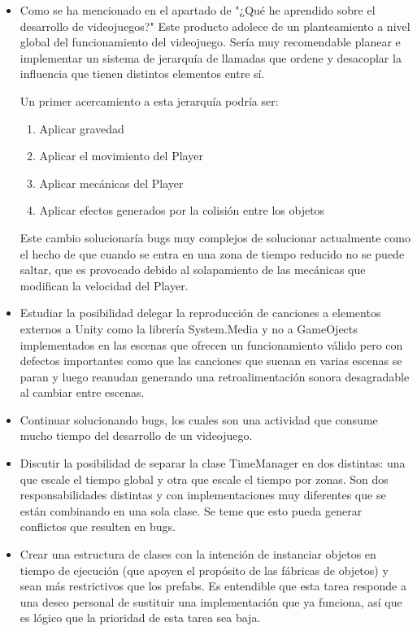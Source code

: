\begin{itemize}
\item
Como se ha mencionado en el apartado de "¿Qué he aprendido sobre el desarrollo de videojuegos?" Este producto adolece de un planteamiento a nivel global del funcionamiento del videojuego. Sería muy recomendable planear e implementar un sistema de jerarquía de llamadas que ordene y desacoplar la influencia que tienen distintos elementos entre sí.

Un primer acercamiento a esta jerarquía podría ser:
\begin{enumerate}
\item
Aplicar gravedad
\item
Aplicar el movimiento del Player
\item
Aplicar mecánicas del Player
\item
Aplicar efectos generados por la colisión entre los objetos
\end{enumerate}

Este cambio solucionaría bugs muy complejos de solucionar actualmente como el hecho de que cuando se entra en una zona de tiempo reducido no se puede saltar, que es provocado debido al solapamiento de las mecánicas que modifican la velocidad del Player.

\item
Estudiar la posibilidad delegar la reproducción de canciones a elementos externos a Unity como la librería System.Media y no a GameOjects implementados en las escenas que ofrecen un funcionamiento válido pero con defectos importantes como que las canciones que suenan en varias escenas se paran y luego reanudan generando una retroalimentación sonora desagradable al cambiar entre escenas.

\item
Continuar solucionando bugs, los cuales son una actividad que consume mucho tiempo del desarrollo de un videojuego.

\item
Discutir la posibilidad de separar la clase TimeManager en dos distintas: una que escale el tiempo global y otra que escale el tiempo
por zonas. Son dos responsabilidades distintas y con implementaciones muy diferentes que se están combinando en una sola clase. Se teme que esto pueda generar conflictos que resulten en bugs.

\item
Crear una estructura de clases con la intención de instanciar objetos en tiempo de ejecución (que apoyen el propósito de las fábricas de objetos) y sean más restrictivos que los prefabs. Es entendible que esta tarea responde a una deseo personal de sustituir una implementación que ya funciona, así que es lógico que la prioridad de esta tarea sea baja.
\end{itemize}